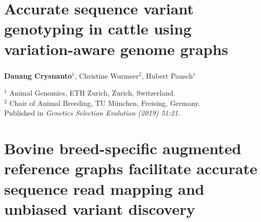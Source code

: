 \documentclass[11 pt, a4paper, notitlepage, twoside]{report}
\begin{document}
\iftwoside
\cleardoublepage
\newpage
\fi


\chapter[Genotyping from variation-aware graphs]{\LARGE{Accurate sequence variant genotyping in cattle using variation-aware genome graphs}}
\label{chap:locgraph}

\subsection*{}
\onehalfspacing
\normalsize

{
\vspace{2em}
\setlength\parindent{0pt}
\large

\textbf{Danang Crysnanto}$^{1}$, Christine Wurmser$^{2}$, Hubert Pausch$^{1}$ \\

\vspace{0.5em}

$^1$ Animal Genomics, ETH Zurich, Zurich, Switzerland. \\
$^2$ Chair of Animal Breeding, TU München, Freising, Germany. \\

\bigskip
Published in \emph{Genetics Selection Evolution (2019) 51:21.}

\bigskip

\begin{center}\end{center}

}




\iftwoside
\cleardoublepage
\newpage
\fi



\chapter[Unbiased variant analysis using genome graphs]{\LARGE{Bovine breed-specific augmented reference graphs facilitate accurate sequence read mapping and unbiased variant discovery}}
\label{chap:wholegraph}
\end{document}
